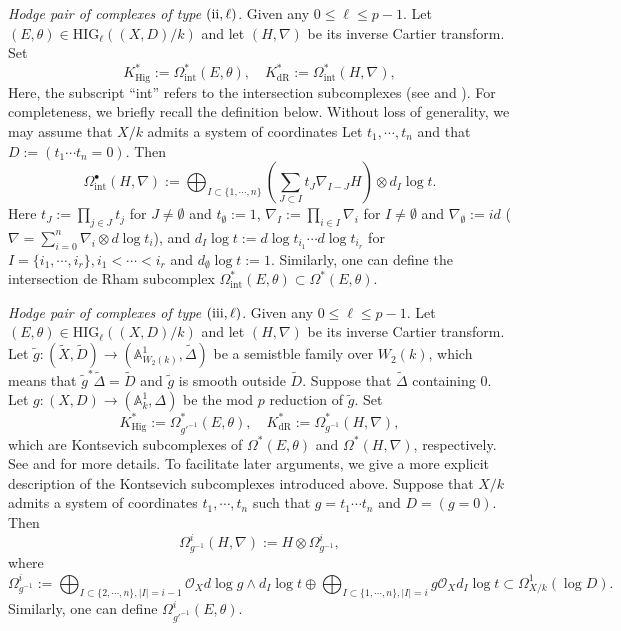 \documentclass[12pt, a4paper]{article}
\begin{document}
\emph{Hodge pair of complexes of type $(\mathrm{\uppercase\expandafter{\romannumeral2}},\ell)$}. Given any $0\leq\ell\leq p-1$. Let $(E,\theta)\in\mathrm{HIG}_\ell((X,D)/k)$ and let $(H,\nabla)$ be its inverse Cartier transform. Set
$$
K^*_{\mathrm{Hig}}:=\Omega_\mathrm{int}^*(E,\theta),\quad
K^*_{\mathrm{dR}}:=\Omega_\mathrm{int}^*(H,\nabla),
$$ 
Here, the subscript “int” refers to the intersection subcomplexes (see \cite[Definition 8.3.31]{CEGT} and \cite[\S2]{SZ2}). For completeness, we briefly recall the definition below. Without loss of generality, we may assume that $X/k$ admits a system of coordinates 
Let $t_1,\cdots,t_n$ and that $D:=(t_1\cdots t_n=0)$. Then
 $$
 \Omega^\bullet_\mathrm{int}(H,\nabla):=\bigoplus_{I\subset\{1,\cdots,n\}}(\sum_{J\subset I}t_J\nabla_{I-J}H)\otimes d_I\log t.
 $$
 Here $t_J:=\prod_{j\in J}t_j$ for $J\neq\emptyset$ and $t_\emptyset:=1$,  $\nabla_I:=\prod_{i\in I}\nabla_i$ for $I\neq\emptyset$ and $\nabla_\emptyset:=id$ ($\nabla=\sum_{i=0}^n\nabla_i\otimes d\log t_i$), and $d_I\log t:=d\log t_{i_1}\cdots d\log t_{i_r}$ for $I=\{i_1,\cdots,i_r\},i_1<\cdots<i_r$ and $d_\emptyset\log t:=1$. Similarly, one can define the intersection de Rham subcomplex $\Omega^*_\mathrm{int}(E,\theta)\subset\Omega^*(E,\theta)$.

\emph{Hodge pair of complexes of type $(\mathrm{\uppercase\expandafter{\romannumeral3}},\ell)$}. Given any $0\leq\ell\leq p-1$. Let $(E,\theta)\in\mathrm{HIG}_\ell((X,D)/k)$ and let $(H,\nabla)$ be its inverse Cartier transform.  Let $\tilde g:(\tilde X,\tilde D)\to(\mathbb A_{W_2(k)}^1,\tilde \Delta)$ be a semistble family over $W_2(k)$, which means that $\tilde g^*\tilde\Delta=\tilde D$ and $\tilde g$ is smooth outside $\tilde D$. Suppose that $\tilde\Delta$ containing $0$. Let $g:(X,D)\to(\mathbb A^1_k,\Delta)$ be the mod $p$ reduction of $\tilde g$. Set
$$
K^*_{\mathrm{Hig}}:=\Omega_{g'^{-1}}^*(E,\theta),\quad
K^*_{\mathrm{dR}}:=\Omega_{g^{-1}}^*(H,\nabla),
$$
which are Kontsevich subcomplexes of $\Omega^*(E,\theta)$ and $\Omega^*(H,\nabla)$, respectively. See \cite[Definition 2.11]{KKP} and \cite[\S1.3]{ESY} for more details. To facilitate later arguments, we give a more explicit description of the Kontsevich subcomplexes introduced above.
 Suppose that $X/k$ admits a system of coordinates $t_1,\cdots,t_n$ such that $g=t_1\cdots t_n$ and $D=(g=0)$. Then
$$
\Omega^i_{g^{-1}}(H,\nabla):=H\otimes\Omega^i_{g^{-1}},
$$
where
$$\Omega^i_{g^{-1}}:=\bigoplus_{I\subset\{2,\cdots,n\},|I|=i-1}\mathcal O_Xd\log g\wedge d_I\log t\oplus\bigoplus_{I\subset\{1,\cdots,n\},|I|=i}g\mathcal O_Xd_I\log t\subset\Omega^1_{X/k}(\log D).
$$
Similarly, one can define $\Omega_{g'^{-1}}^i(E,\theta)$.
\end{document}
